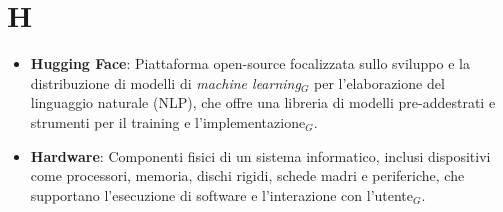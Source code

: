 \section{H}
\begin{itemize}
    \item \textbf{Hugging Face}: Piattaforma open-source focalizzata sullo sviluppo e la distribuzione di modelli di \textit{machine learning}$_G$ per l'elaborazione del linguaggio naturale (NLP), che offre una libreria di modelli pre-addestrati e strumenti per il training e l'implementazione$_G$.
    \item \textbf{Hardware}: Componenti fisici di un sistema informatico, inclusi dispositivi come processori, memoria, dischi rigidi, schede madri e periferiche, che supportano l'esecuzione di software e l'interazione con l'utente$_G$.
     
\end{itemize}